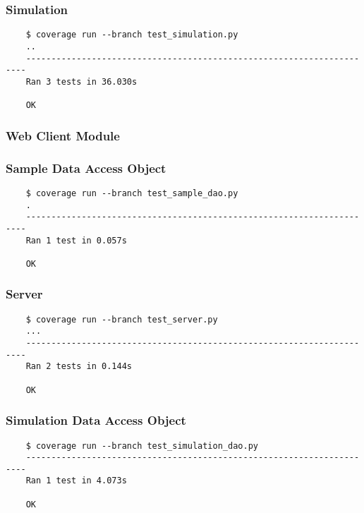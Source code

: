 \documentclass[a4paper,11pt]{article}
\begin{document}
\subsubsection*{{\hspace{6mm}}Simulation}
\begin{verbatim}
    $ coverage run --branch test_simulation.py
    ..
    ----------------------------------------------------------------------
    Ran 3 tests in 36.030s

    OK
\end{verbatim}

\subsubsection{Web Client Module}
\subsubsection*{{\hspace{6mm}}Sample Data Access Object}
\begin{verbatim}
    $ coverage run --branch test_sample_dao.py 
    .
    ----------------------------------------------------------------------
    Ran 1 test in 0.057s

    OK
\end{verbatim}

\subsubsection*{{\hspace{6mm}}Server}
\begin{verbatim}
    $ coverage run --branch test_server.py
    ...
    ----------------------------------------------------------------------
    Ran 2 tests in 0.144s

    OK
\end{verbatim}

\subsubsection*{{\hspace{6mm}}Simulation Data Access Object}
\begin{verbatim}
    $ coverage run --branch test_simulation_dao.py
    ----------------------------------------------------------------------
    Ran 1 test in 4.073s

    OK
\end{verbatim}
\end{document}
